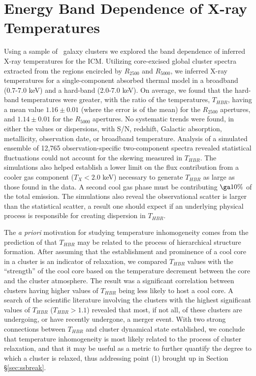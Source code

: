 \section{Energy Band Dependence of X-ray Temperatures}

Using a sample of \ebandnuma\ galaxy clusters we explored the band
dependence of inferred X-ray temperatures for the ICM. Utilizing
core-excised global cluster spectra extracted from the regions
encircled by $R_{2500}$ and $R_{5000}$, we inferred X-ray temperatures
for a single-component absorbed thermal model in a broadband (0.7-7.0
keV) and a hard-band (2.0-7.0 keV). On average, we found that the
hard-band temperatures were greater, with the ratio of the
temperatures, $T_{HBR}$, having a mean value $1.16 \pm 0.01$ (where
the error is of the mean) for the $R_{2500}$ apertures, and $1.14 \pm
0.01$ for the $R_{5000}$ apertures. No systematic trends were found,
in either the values or dispersions, with S/N, redshift, Galactic
absorption, metallicity, observation date, or broadband
temperature. Analysis of a simulated ensemble of 12,765
observation-specific two-component spectra revealed statistical
fluctuations could not account for the skewing measured in
$T_{HBR}$. The simulations also helped establish a lower limit on the
flux contribution from a cooler gas component ($T_X < 2.0$ keV)
necessary to generate $T_{HBR}$ as large as those found in the data. A
second cool gas phase must be contributing $\ga 10\%$ of the total
emission. The simulations also reveal the observational scatter is
larger than the statistical scatter, a result one should expect if an
underlying physical process is responsible for creating dispersion in
$T_{HBR}$.

The {\it{a priori}} motivation for studying temperature inhomogeneity
comes from the prediction of \citet{2001ApJ...546..100M} that
$T_{HBR}$ may be related to the process of hierarchical structure
formation. After assuming that the establishment and prominence of a
cool core in a cluster is an indicator of relaxation, we compared
$T_{HBR}$ values with the ``strength'' of the cool core based on the
temperature decrement between the core and the cluster atmosphere. The
result was a significant correlation between clusters having higher
values of $T_{HBR}$ being less likely to host a cool core. A search of
the scientific literature involving the clusters with the highest
significant values of $T_{HBR}$ ($T_{HBR} > 1.1$) revealed that most,
if not all, of these clusters are undergoing, or have recently
undergone, a merger event. With two strong connections between
$T_{HBR}$ and cluster dynamical state established, we conclude that
temperature inhomogeneity is most likely related to the process of
cluster relaxation, and that it may be useful as a metric to further
quantify the degree to which a cluster is relaxed, thus addressing
point (1) brought up in Section \S\ref{sec:ssbreak}.

